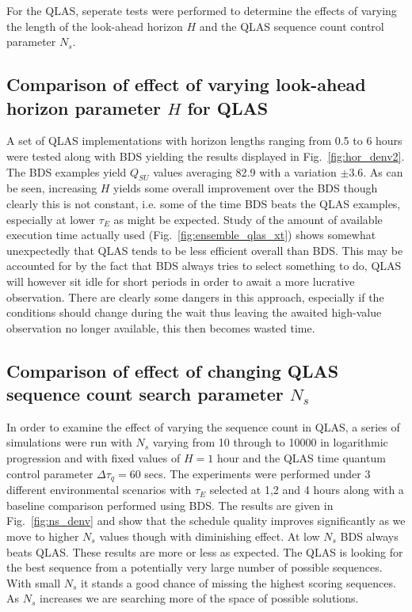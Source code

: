 For the QLAS, seperate tests were performed to determine the effects of varying the length of the look-ahead horizon $H$ and the QLAS sequence count control parameter $N_s$.


\subsection{Comparison of effect of varying look-ahead horizon parameter $H$ for QLAS}
A set of QLAS implementations with horizon lengths ranging from 0.5 to 6 hours were tested along with BDS yielding the results displayed in Fig.~\ref{fig:hor_denv2}. The BDS examples yield $Q_{SU}$ values averaging 82.9 with a variation $\pm 3.6$. As can be seen, increasing $H$ yields some overall improvement over the BDS though clearly this is not constant, i.e. some of the time BDS beats the QLAS examples, especially at lower $\tau_E$ as might be expected. Study of the amount of available execution time actually used (Fig.~\ref{fig:ensemble_qlas_xt}) shows somewhat unexpectedly that QLAS tends to be less efficient overall than BDS. This may be accounted for by the fact that BDS always tries to select something to do, QLAS will however sit idle for short periods in order to await a more lucrative observation. There are clearly some dangers in this approach, especially if the conditions should change during the wait thus leaving the awaited high-value observation no longer available, this then becomes wasted time. 



\subsection{Comparison of effect of changing QLAS sequence count search parameter $N_s$} 
In order to examine the effect of varying the sequence count in QLAS, a series of simulations were run with $N_s$ varying from 10 through to 10000 in logarithmic progression and with fixed values of $H = 1$ hour and the QLAS time quantum control parameter $\Delta \tau_q = 60$ secs. The experiments were performed under 3 different environmental scenarios with $\tau_E$ selected at 1,2 and 4 hours along with a baseline comparison performed using BDS. The results are given in Fig.~\ref{fig:ns_denv} and show that the schedule quality improves significantly as we move to higher $N_s$ values though with diminishing effect. At low $N_s$ BDS always beats QLAS. These results are more or less as expected. The QLAS is looking for the best sequence from a potentially very large number of possible sequences. With small $N_s$ it stands a good chance of missing  the highest scoring sequences. As $N_s$ increases we are searching more of the space of possible solutions. 


